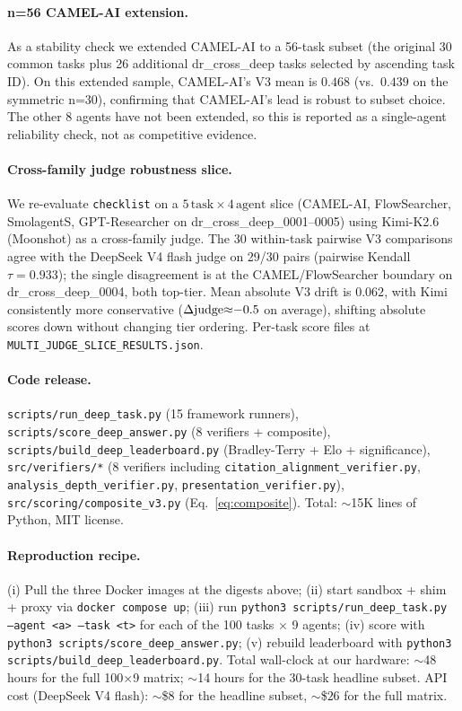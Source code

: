 \documentclass{article}
\begin{document}
\paragraph{n=56 CAMEL-AI extension.} As a stability check we extended CAMEL-AI to a 56-task subset (the original 30 common tasks plus 26 additional dr\_cross\_deep tasks selected by ascending task ID). On this extended sample, CAMEL-AI's V3 mean is $0.468$ (vs.\ $0.439$ on the symmetric n=30), confirming that CAMEL-AI's lead is robust to subset choice. The other 8 agents have not been extended, so this is reported as a single-agent reliability check, not as competitive evidence.

\paragraph{Cross-family judge robustness slice.} We re-evaluate \texttt{checklist} on a $5\,\text{task} \times 4\,\text{agent}$ slice (CAMEL-AI, FlowSearcher, SmolagentS, GPT-Researcher on dr\_cross\_deep\_0001--0005) using Kimi-K2.6 (Moonshot) as a cross-family judge. The 30 within-task pairwise V3 comparisons agree with the DeepSeek V4 flash judge on 29/30 pairs (pairwise Kendall $\tau{=}0.933$); the single disagreement is at the CAMEL/FlowSearcher boundary on dr\_cross\_deep\_0004, both top-tier. Mean absolute V3 drift is $0.062$, with Kimi consistently more conservative ($\Delta{\rm judge}{\approx}{-}0.5$ on average), shifting absolute scores down without changing tier ordering. Per-task score files at \texttt{MULTI\_JUDGE\_SLICE\_RESULTS.json}.

\paragraph{Code release.} \texttt{scripts/run\_deep\_task.py} (15 framework runners), \texttt{scripts/score\_deep\_answer.py} (8 verifiers + composite), \texttt{scripts/build\_deep\_leaderboard.py} (Bradley-Terry + Elo + significance), \texttt{src/verifiers/*} (8 verifiers including \texttt{citation\_alignment\_verifier.py}, \texttt{analysis\_depth\_verifier.py}, \texttt{presentation\_verifier.py}), \texttt{src/scoring/composite\_v3.py} (Eq.~\eqref{eq:composite}). Total: $\sim$15K lines of Python, MIT license.

\paragraph{Reproduction recipe.} (i) Pull the three Docker images at the digests above; (ii) start sandbox + shim + proxy via \texttt{docker compose up}; (iii) run \texttt{python3 scripts/run\_deep\_task.py --agent <a> --task <t>} for each of the 100 tasks $\times$ 9 agents; (iv) score with \texttt{python3 scripts/score\_deep\_answer.py}; (v) rebuild leaderboard with \texttt{python3 scripts/build\_deep\_leaderboard.py}. Total wall-clock at our hardware: $\sim$48 hours for the full 100$\times$9 matrix; $\sim$14 hours for the 30-task headline subset. API cost (DeepSeek V4 flash): $\sim$\$$8$ for the headline subset, $\sim$\$$26$ for the full matrix.
\end{document}
